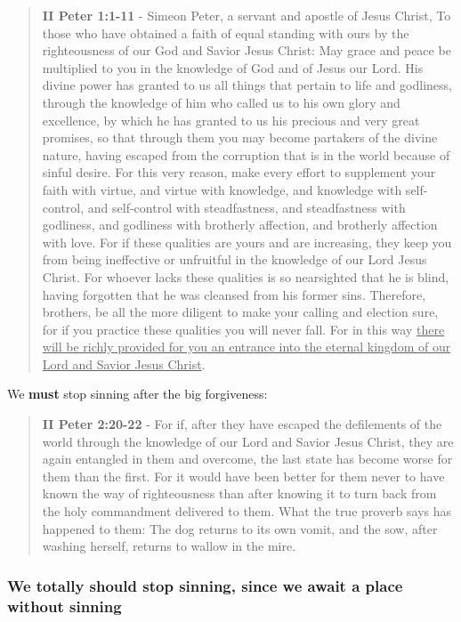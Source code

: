 \documentclass[11pt]{article}
\begin{document}
\begin{quote}
\textbf{II Peter 1:1-11} - Simeon Peter, a servant and apostle of Jesus Christ, To those who have obtained a faith of equal standing with ours by the righteousness of our God and Savior Jesus Christ: May grace and peace be multiplied to you in the knowledge of God and of Jesus our Lord.  His divine power has granted to us all things that pertain to life and godliness, through the knowledge of him who called us to his own glory and excellence, by which he has granted to us his precious and very great promises, so that through them you may become partakers of the divine nature, having escaped from the corruption that is in the world because of sinful desire.  For this very reason, make every effort to supplement your faith with virtue, and virtue with knowledge, and knowledge with self-control, and self-control with steadfastness, and steadfastness with godliness, and godliness with brotherly affection, and brotherly affection with love.  For if these qualities are yours and are increasing, they keep you from being ineffective or unfruitful in the knowledge of our Lord Jesus Christ.  For whoever lacks these qualities is so nearsighted that he is blind, having forgotten that he was cleansed from his former sins.  Therefore, brothers, be all the more diligent to make your calling and election sure, for if you practice these qualities you will never fall.  For in this way \uline{there will be richly provided for you an entrance into the eternal kingdom of our Lord and Savior Jesus Christ}.
\end{quote}

We \textbf{must} stop sinning after the big forgiveness:

\begin{quote}
\textbf{II Peter 2:20-22} - For if, after they have escaped the defilements of the world through the knowledge of our Lord and Savior Jesus Christ, they are again entangled in them and overcome, the last state has become worse for them than the first. For it would have been better for them never to have known the way of righteousness than after knowing it to turn back from the holy commandment delivered to them. What the true proverb says has happened to them: The dog returns to its own vomit, and the sow, after washing herself, returns to wallow in the mire.
\end{quote}

\subsubsection{We totally \textbf{should} stop sinning, since we await a place without sinning}
\label{sec:orga87efd4}
\end{document}
